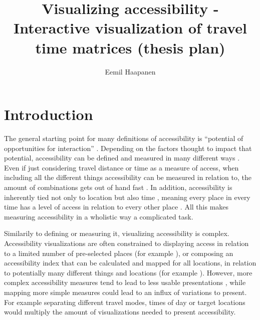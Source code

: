 \documentclass[12pt]{article}
\title{Visualizing accessibility - Interactive visualization of travel time matrices (thesis plan)}
\author{Eemil Haapanen}
\begin{document}
\maketitle

\section{Introduction}
The general starting point for many definitions of accessibility is
\enquote{potential of opportunities for interaction} \parencite{han1959}.
Depending on the factors thought to impact that potential,
accessibility can be defined and measured in many different ways \parencite{pap2016}.
Even if just considering travel distance or time as a measure of access,
when including all the different things accessibility can be measured in relation to,
the amount of combinations gets out of hand fast \parencite{lev2020}.
In addition, accessibility is inherently tied not only to location
but also time \parencite{jar2018},
meaning every place in every time has a level of access
in relation to every other place \parencite{lev2020}.
All this makes measuring accessibility in a wholistic way a complicated task.

Similarily to defining or measuring it, visualizing accessibility is complex.
Accessibility visualizations are often constrained to displaying access in relation to
a limited number of pre-selected places (for example \textcite{wei2018}),
or composing an accessibility index that can be calculated and mapped for all locations,
in relation to potentially many different things and locations (for example \textcite{kim2019}).
However, more complex accessibility measures tend to lead to
less usable presentations \parencite{te2014},
while mapping more simple measures could lead to an influx of variations to present.
For example separating different travel modes, times of day or target locations
would multiply the amount of visualizations needed to present accessibility.
\end{document}
